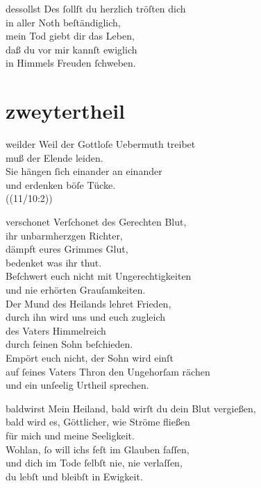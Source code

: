 \documentclass[tocstyle=ref-genre]{ees}
\begin{document}
{  \begin{movement}{dessollst}
    \voice[Coro]
    Des ſollſt du herzlich tröſten dich\\
    in aller Noth beſtändiglich,\\
    mein Tod giebt dir das Leben,\\
    daß du vor mir kannſt ewiglich\\
    in Himmels Freuden ſchweben.
  \end{movement}

  \part{zweytertheil}

  \begin{movement}{weilder}
    \voice[Coro]
    Weil der Gottloſe Uebermuth treibet\\
    muß der Elende leiden.\\
    Sie hängen ſich einander an einander\\
    und erdenken böſe Tücke.\\
    ((11/10:2))
  \end{movement}

  \begin{movement}{verschonet}
    \voice[Soprano]
    Verſchonet des Gerechten Blut,\\
    ihr unbarmherzgen Richter,\\
    dämpft eures Grimmes Glut,\\
    bedenket was ihr thut.\\
    Beſchwert euch nicht mit Ungerechtigkeiten\\
    und nie erhörten Grauſamkeiten.\\
    Der Mund des Heilands lehret Frieden,\\
    durch ihn wird uns und euch zugleich\\
    des Vaters Himmelreich\\
    durch ſeinen Sohn beſchieden.\\
    Empört euch nicht, der Sohn wird einſt\\
    auf ſeines Vaters Thron den Ungehorſam rächen\\
    und ein unſeelig Urtheil sprechen.
  \end{movement}

  \begin{movement}{baldwirst}
    \voice[Soprano]
    Mein Heiland, bald wirſt du dein Blut vergießen,\\
    bald wird es, Göttlicher, wie Ströme fließen\\
    für mich und meine Seeligkeit.\\
    Wohlan, ſo will ichs feſt im Glauben faſſen,\\
    und dich im Tode ſelbſt nie, nie verlaſſen,\\
    du lebſt und bleibſt in Ewigkeit.
  \end{movement}

}
\end{document}
